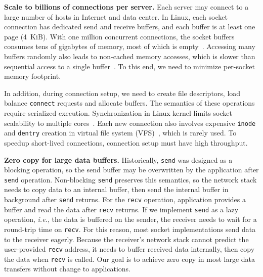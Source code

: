 \textbf{Scale to billions of connections per server.}
Each server may connect to a large number of hosts in Internet and data center. In Linux, each socket connection has dedicated send and receive buffers, and each buffer is at least one page (4~KiB). With one million concurrent connections, the socket buffers consumes tens of gigabytes of memory, most of which is empty~\cite{lin2016scalable}. Accessing many buffers randomly also leads to non-cached memory accesses, which is slower than sequential access to a single buffer~\cite{li2017kv}. To this end, we need to minimize per-socket memory footprint.

In addition, during connection setup, we need to create file descriptors, load balance \texttt{connect} requests and allocate buffers. The semantics of these operations require serialized execution. Synchronization in Linux kernel limits socket scalability to multiple cores~\cite{lin2016scalable,han2012megapipe}. Each new connection also involves expensive \texttt{inode} and \texttt{dentry} creation in virtual file system (VFS)~\cite{boyd2010analysis}, which is rarely used. To speedup short-lived connections, connection setup must have high throughput.



\textbf{Zero copy for large data buffers.}
Historically, \texttt{send} was designed as a blocking operation, so the send buffer may be overwritten by the application after \texttt{send} operation.
Non-blocking \texttt{send} preserves this semantics, so the network stack needs to copy data to an internal buffer, then send the internal buffer in background after \texttt{send} returns.
For the \texttt{recv} operation, application provides a buffer and read the data after \texttt{recv} returns.
If we implement \texttt{send} as a lazy operation, \textit{i.e.}, the data is buffered on the sender, the receiver needs to wait for a round-trip time on \texttt{recv}.
For this reason, most socket implementations send data to the receiver eagerly. Because the receiver's network stack cannot predict the user-provided \texttt{recv} address, it needs to buffer received data internally, then copy the data when \texttt{recv} is called.
Our goal is to achieve zero copy in most large data transfers without change to applications.

